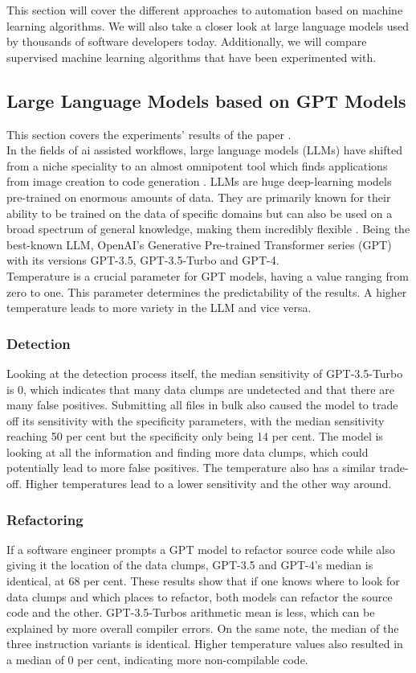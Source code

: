 This section will cover the different approaches to automation based on machine learning algorithms. We will also take a closer look at large language models used by thousands of software developers today. Additionally, we will compare supervised machine learning algorithms that have been experimented with.
\subsection{Large Language Models based on GPT Models}
This section covers the experiments' results of the paper \cite[AI-Driven Refactoring: A Pipeline for Identifying and Correcting Data Clumps in Git Repositories]{baumgartner2024aidriven}.\\
In the fields of ai assisted workflows, large language models (LLMs) have shifted from a niche speciality to an almost omnipotent tool which finds applications from image creation to code generation \cite{meyer2024ai}. LLMs are huge deep-learning models pre-trained on enormous amounts of data. They are primarily known for their ability to be trained on the data of specific domains but can also be used on a broad spectrum of general knowledge, making them incredibly flexible \cite{baumgartner2024aidriven}.
Being the best-known LLM, OpenAI's Generative Pre-trained Transformer series (GPT) with its versions GPT-3.5, GPT-3.5-Turbo and GPT-4.\\
Temperature is a crucial parameter for GPT models, having a value ranging from zero to one. This parameter determines the predictability of the results.
A higher temperature leads to more variety in the LLM and vice versa.
\subsubsection{Detection}
Looking at the detection process itself, the median sensitivity of GPT-3.5-Turbo is 0, which indicates that many data clumps are undetected and that there are many false positives.
Submitting all files in bulk also caused the model to trade off its sensitivity with the specificity parameters, with the median sensitivity reaching 50 per cent but the specificity only being 14 per cent.
The model is looking at all the information and finding more data clumps, which could potentially lead to more false positives.
The temperature also has a similar trade-off. Higher temperatures lead to a lower sensitivity and the other way around.
\subsubsection{Refactoring}
If a software engineer prompts a GPT model to refactor source code while also giving it the location of the data clumps, GPT-3.5 and GPT-4's median is identical, at 68 per cent.
These results show that if one knows where to look for data clumps and which places to refactor, both models can refactor the source code and the other.
GPT-3.5-Turbos arithmetic mean is less, which can be explained by more overall compiler errors.
On the same note, the median of the three instruction variants is identical.
Higher temperature values also resulted in a median of 0 per cent, indicating more non-compilable code.
